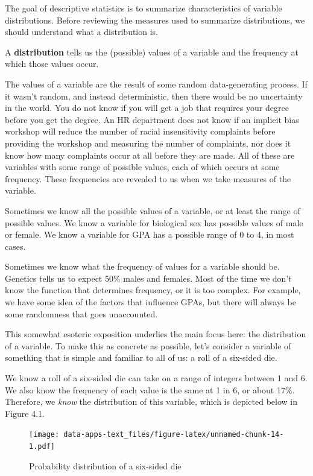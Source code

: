 \documentclass[
]{book}
\begin{document}
The goal of descriptive statistics is to summarize characteristics of variable distributions. Before reviewing the measures used to summarize distributions, we should understand what a distribution is.

A \textbf{distribution} tells us the (possible) values of a variable and the frequency at which those values occur.

The values of a variable are the result of some random data-generating process. If it wasn't random, and instead deterministic, then there would be no uncertainty in the world. You do not know if you will get a job that requires your degree before you get the degree. An HR department does not know if an implicit bias workshop will reduce the number of racial insensitivity complaints before providing the workshop and measuring the number of complaints, nor does it know how many complaints occur at all before they are made. All of these are variables with some range of possible values, each of which occurs at some frequency. These frequencies are revealed to us when we take measures of the variable.

Sometimes we know all the possible values of a variable, or at least the range of possible values. We know a variable for biological sex has possible values of male or female. We know a variable for GPA has a possible range of 0 to 4, in most cases.

Sometimes we know what the frequency of values for a variable should be. Genetics tells us to expect 50\% males and females. Most of the time we don't know the function that determines frequency, or it is too complex. For example, we have some idea of the factors that influence GPAs, but there will always be some randomness that goes unaccounted.

This somewhat esoteric exposition underlies the main focus here: the distribution of a variable. To make this as concrete as possible, let's consider a variable of something that is simple and familiar to all of us: a roll of a six-sided die.

We know a roll of a six-sided die can take on a range of integers between 1 and 6. We also know the frequency of each value is the same at 1 in 6, or about 17\%. Therefore, we \emph{know} the distribution of this variable, which is depicted below in Figure 4.1.

\begin{figure}
\centering
\texttt{[image: data-apps-text\_files/figure-latex/unnamed-chunk-14-1.pdf]}
\caption{\label{fig:unnamed-chunk-14}Probability distribution of a six-sided die}
\end{figure}
\end{document}
